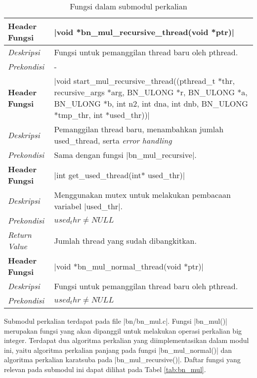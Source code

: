 \begin{table}[h]
    \small
  \caption{Fungsi dalam submodul perkalian}
  \label{tab:bn_mul_par}
  \begin{tabular}{R{2.8cm}L{10.5cm}}

    \toprule
    \textbf{Header Fungsi} & |void *bn_mul_recursive_thread(void *ptr)| \\ \midrule
    \textit{Deskripsi}     & Fungsi untuk pemanggilan thread baru oleh pthread.\\
    \textit{Prekondisi}    & -\\
    \bottomrule
    
    \textbf{Header Fungsi} & |void start_mul_recursive_thread((pthread_t *thr, recursive_args *arg, BN_ULONG *r, BN_ULONG *a, BN_ULONG *b, int n2, int dna, int dnb, BN_ULONG *tmp_thr, int *used_thr))| \\ \midrule
    \textit{Deskripsi}     & Pemanggilan thread baru, menambahkan jumlah used\_thread, serta \textit{error handling}\\
    \textit{Prekondisi}    & Sama dengan fungsi |bn_mul_recursive|.\\
    \bottomrule

    \textbf{Header Fungsi} & |int get_used_thread(int* used_thr)| \\ \midrule
    \textit{Deskripsi}     & Menggunakan mutex untuk melakukan pembacaan variabel |used_thr|.\\
    \textit{Prekondisi}    & $used_thr \neq NULL$\\
    \textit{Return Value}  & Jumlah thread yang sudah dibangkitkan. \\
    \bottomrule

    \textbf{Header Fungsi} & |void *bn_mul_normal_thread(void *ptr)| \\ \midrule
    \textit{Deskripsi}     & Fungsi untuk pemanggilan thread baru oleh pthread.\\
    \textit{Prekondisi}    & $used_thr \neq NULL$\\
    \bottomrule
  \end{tabular}
\end{table}

  Submodul perkalian terdapat pada file |bn/bn_mul.c|. Fungsi |bn_mul()| merupakan fungsi yang akan dipanggil untuk melakukan operasi perkalian big integer. Terdapat dua algoritma perkalian yang diimplementasikan dalam modul ini, yaitu algoritma perkalian panjang pada fungsi |bn_mul_normal()| dan algoritma perkalian karatsuba pada |bn_mul_recursive()|. Daftar fungsi yang relevan pada submodul ini dapat dilihat pada Tabel \ref{tab:bn_mul}.

